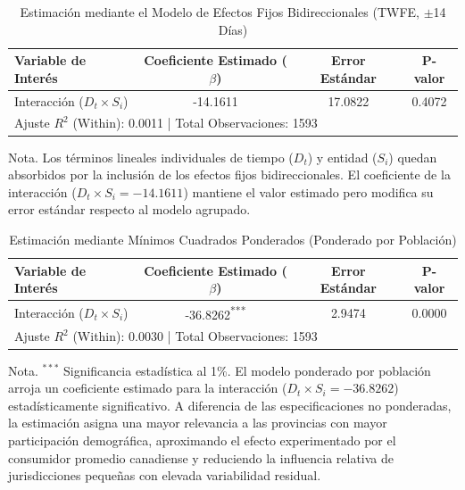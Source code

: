 \begin{table}[H]
    \centering
    \caption{Estimaci\'on mediante el Modelo de Efectos Fijos Bidireccionales (TWFE, $\pm$14 D\'ias)}
    \label{tab:twfe_base}
    \small
    \begin{tabular}{lccc}
        \toprule
        Variable de Inter\'es & Coeficiente Estimado ($\beta$) & Error Est\'andar & P-valor \\
        \midrule
        Interacci\'on ($D_t \times S_i$) & -14.1611 & 17.0822 & 0.4072 \\
        \midrule
        \multicolumn{4}{l}{\small Ajuste $R^2$ (Within): 0.0011 \quad | \quad Total Observaciones: 1593} \\
        \bottomrule
    \end{tabular}
    \vspace{0.1cm}
    \begin{flushleft}
    \small{Nota. Los t\'erminos lineales individuales de tiempo ($D_t$) y entidad ($S_i$) quedan absorbidos por la inclusi\'on de los efectos fijos bidireccionales. El coeficiente de la interacci\'on ($D_t \times S_i = -14.1611$) mantiene el valor estimado pero modifica su error est\'andar respecto al modelo agrupado.}
    \end{flushleft}
\end{table}

\begin{table}[H]
    \centering
    \caption{Estimaci\'on mediante M\'inimos Cuadrados Ponderados (Ponderado por Poblaci\'on)}
    \label{tab:wls_ponderado}
    \small
    \begin{tabular}{lccc}
        \toprule
        Variable de Inter\'es & Coeficiente Estimado ($\beta$) & Error Est\'andar & P-valor \\
        \midrule
        Interacci\'on ($D_t \times S_i$) & -36.8262\textsuperscript{***} & 2.9474 & 0.0000 \\
        \midrule
        \multicolumn{4}{l}{\small Ajuste $R^2$ (Within): 0.0030 \quad | \quad Total Observaciones: 1593} \\
        \bottomrule
    \end{tabular}
    \vspace{0.1cm}
    \begin{flushleft}
    \small{Nota. $^{***}$ Significancia estad\'istica al 1\%. El modelo ponderado por poblaci\'on arroja un coeficiente estimado para la interacci\'on ($D_t \times S_i = -36.8262$) estad\'isticamente significativo. A diferencia de las especificaciones no ponderadas, la estimaci\'on asigna una mayor relevancia a las provincias con mayor participaci\'on demogr\'afica, aproximando el efecto experimentado por el consumidor promedio canadiense y reduciendo la influencia relativa de jurisdicciones peque\~nas con elevada variabilidad residual.}
    \end{flushleft}
\end{table}

